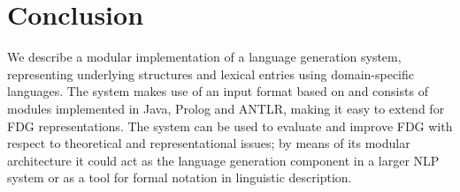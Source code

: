 \documentclass[a4paper, halfparskip, onecolumn, abstracton, final, figurecaptionabove]{scrartcl}
\newcommand{\noun}[1]{\textsc{#1}}
\begin{document}
\begin{figure}
\begin{center}
\end{center}
 \label{antlr-rl}
\end{figure}


\begin{figure}
\begin{center}
\end{center}
 \label{antlr-rl}
\end{figure}


\section{Conclusion}
\normalsize
We describe a modular implementation of a language generation system, representing underlying structures and lexical entries using domain-specific languages. The system makes use of an input format based on \cite{Dik1997a} and consists of modules implemented in Java, Prolog and ANTLR, making it easy to extend for FDG representations. The system can be used to evaluate and improve FDG with respect to theoretical and representational issues; by means of its modular architecture it could act as the language generation component in a larger NLP system or as a tool for formal notation in linguistic description.







\end{document}
